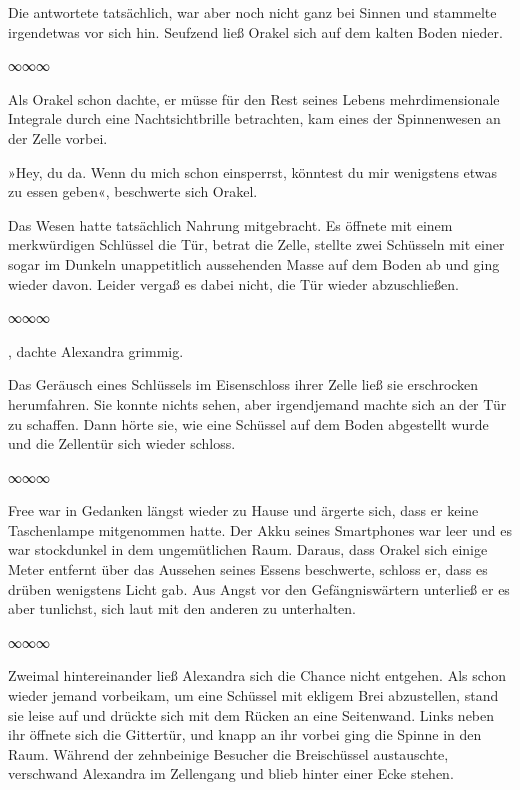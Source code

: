 Die antwortete tatsächlich, war aber noch nicht ganz bei Sinnen und stammelte irgendetwas vor sich hin. Seufzend ließ Orakel sich auf dem kalten Boden nieder.

\begin{center}
    ∞∞∞
\end{center}

Als Orakel schon dachte, er müsse für den Rest seines Lebens mehrdimensionale Integrale durch eine Nachtsichtbrille betrachten, kam eines der Spinnenwesen an der Zelle vorbei.

»Hey, du da. Wenn du mich schon einsperrst, könntest du mir wenigstens etwas zu essen geben«, beschwerte sich Orakel.

Das Wesen hatte tatsächlich Nahrung mitgebracht. Es öffnete mit einem merkwürdigen Schlüssel die Tür, betrat die Zelle, stellte zwei Schüsseln mit einer sogar im Dunkeln unappetitlich aussehenden Masse auf dem Boden ab und ging wieder davon. Leider vergaß es dabei nicht, die Tür wieder abzuschließen.

\begin{center}
    ∞∞∞
\end{center}

, dachte Alexandra grimmig. 

Das Geräusch eines Schlüssels im Eisenschloss ihrer Zelle ließ sie erschrocken herumfahren. Sie konnte nichts sehen, aber irgendjemand machte sich an der Tür zu schaffen. Dann hörte sie, wie eine Schüssel auf dem Boden abgestellt wurde und die Zellentür sich wieder schloss.

\begin{center}
    ∞∞∞
\end{center}

Free war in Gedanken längst wieder zu Hause und ärgerte sich, dass er keine Taschenlampe mitgenommen hatte. Der Akku seines Smartphones war leer und es war stockdunkel in dem ungemütlichen Raum. Daraus, dass Orakel sich einige Meter entfernt über das Aussehen seines Essens beschwerte, schloss er, dass es drüben wenigstens Licht gab. Aus Angst vor den Gefängniswärtern unterließ er es aber tunlichst, sich laut mit den anderen zu unterhalten.

\begin{center}
    ∞∞∞
\end{center}

Zweimal hintereinander ließ Alexandra sich die Chance nicht entgehen. Als schon wieder jemand vorbeikam, um eine Schüssel mit ekligem Brei abzustellen, stand sie leise auf und drückte sich mit dem Rücken an eine Seitenwand. Links neben ihr öffnete sich die Gittertür, und knapp an ihr vorbei ging die Spinne in den Raum. Während der zehnbeinige Besucher die Breischüssel austauschte, verschwand Alexandra im Zellengang und blieb hinter einer Ecke stehen.

